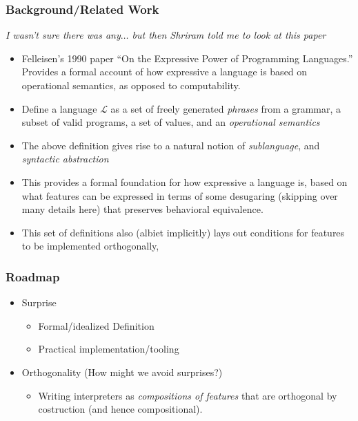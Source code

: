 \documentclass{beamer}
\renewcommand{\L}{\mathcal{L}}
\begin{document}
\begin{frame}
  \frametitle{Background/Related Work}
  {\small \it I wasn't sure there was any$\ldots$ but then Shriram told me to
    look at this paper}
  \begin{itemize}
  \item Felleisen's 1990 paper ``On the Expressive Power of Programming
    Languages.'' Provides a formal account of how expressive a language is based on
    operational semantics, as opposed to computability.

  \item Define a language $\L$ as a set of freely generated \emph{phrases} from
    a grammar, a subset of valid programs, a set of values, and an
    \emph{operational semantics}

  \item The above definition gives rise to a natural notion of
    \emph{sublanguage}, and \emph{syntactic abstraction}
    
   \item This provides a formal foundation for how expressive a language is,
     based on what features can be expressed in terms of some desugaring
     (skipping over many details here) that preserves behavioral equivalence.

   \item This set of definitions also (albiet implicitly) lays out conditions
     for features to be implemented orthogonally, 

  \end{itemize}
  
\end{frame}

\begin{frame}
  \frametitle{Roadmap}
  \begin{itemize}
  \item Surprise

    \begin{itemize}
    \item Formal/idealized Definition
    \item Practical implementation/tooling
    \end{itemize}

  \item Orthogonality (How might we avoid surprises?)

    \begin{itemize}
    \item Writing interpreters as \emph{compositions of features} that are
      orthogonal by costruction (and hence compositional).
    \end{itemize}
    
 
  \end{itemize}
  
\end{frame}
\end{document}
